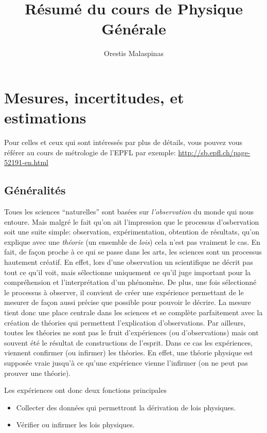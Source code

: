 \documentclass[a4paper,12pt]{book}
\title{Résumé du cours de Physique Générale}
\author{Orestis Malaspinas}
\begin{document}
\maketitle

\chapter{Mesures, incertitudes, et estimations}

Pour celles et ceux qui sont intéressés par plus de détails, vous pouvez vous référer au cours de métrologie de l'EPFL par exemple: \url{http://sb.epfl.ch/page-52191-en.html}

\section{Généralités}

Toues les sciences ``naturelles'' sont basées sur \textit{l'observation} du monde qui nous entoure. 
Mais malgré le fait qu'on ait l'impression que le processus d'osbervation soit une suite simple:
observation, expérimentation, obtention de résultats, qu'on explique avec une \textit{théorie} (un ensemble de \textit{lois}) cela n'est pas vraiment le cas. En fait,
de façon proche à ce qui se passe dans les arts, les sciences sont un processus hautement créatif. 
En effet, lors d'une observation un scientifique ne décrit pas tout ce qu'il voit, 
mais sélectionne uniquement ce qu'il juge important
pour la compréhension et l'interprétation d'un phénomène. De plus, une fois sélectionné
le processus à observer, il convient de créer une expérience permettant de le mesurer de façon aussi précise que possible
pour pouvoir le décrire. La mesure tient donc une place centrale dans les sciences et se complète parfaitement avec la création de théories
qui permettent l'explication d'observations. Par ailleurs, toutes les théories ne sont pas le fruit
d'expériences (ou d'observations) mais ont souvent été le résultat de constructions de l'esprit. 
Dans ce cas les expériences, viennent confirmer (ou infirmer) les théories. En effet, une théorie physique est
supposée vraie jusqu'à ce qu'une expérience vienne l'infirmer (on ne peut pas prouver une théorie).

Les expériences ont donc deux fonctions principales
\begin{itemize}
 \item Collecter des données qui permettront la dérivation de lois physiques.
 \item Vérifier ou infirmer les lois physiques.
\end{itemize}
\end{document}
